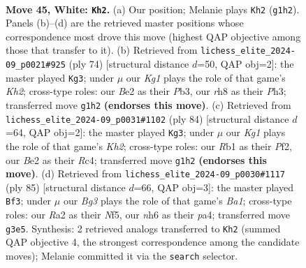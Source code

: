 \documentclass[11pt]{article}
\begin{document}
\clearpage

\begin{figure}[p]\centering
\begin{subfigure}{0.46\textwidth}\centering
\resizebox{\linewidth}{!}{%
\newchessgame
\chessboard[
  setfen={7r/p2rb1kp/7n/P7/8/1Pp3BP/R1P1B1P1/1R4K1 w - - 5 45},
  showmover=false,
  pgfstyle=straightmove, color=movearrow, markmove={g1-h2}
]}
\caption{}
\end{subfigure}\hfill
\begin{subfigure}{0.46\textwidth}\centering
\resizebox{\linewidth}{!}{%
\newchessgame
\chessboard[
  setfen={5rk1/6p1/3r3p/4R3/1p4P1/1P2Pp1P/P1R2P1K/8 w - - 3 38},
  showmover=false,
  pgfstyle=straightmove, color=movearrow, markmove={h2-g3}
]}
\caption{}
\end{subfigure}
\\[4pt]
\begin{subfigure}{0.46\textwidth}\centering
\resizebox{\linewidth}{!}{%
\newchessgame
\chessboard[
  setfen={8/3rk1p1/1p3p1p/3r4/1PR3P1/R6P/1P3P1K/8 w - - 1 43},
  showmover=false,
  pgfstyle=straightmove, color=movearrow, markmove={h2-g3}
]}
\caption{}
\end{subfigure}\hfill
\begin{subfigure}{0.46\textwidth}\centering
\resizebox{\linewidth}{!}{%
\newchessgame
\chessboard[
  setfen={b7/p1k5/1p2pr2/5n2/P5R1/2PN3p/3K3P/2R5 b - - 3 43},
  showmover=false,
  pgfstyle=straightmove, color=movearrow, markmove={a8-f3}
]}
\caption{}
\end{subfigure}
\caption{\textbf{Move 45, White: \texttt{Kh2}.} (a) Our position; Melanie plays \texttt{Kh2} (\texttt{g1h2}). Panels (b)--(d) are the retrieved master positions whose correspondence most drove this move (highest QAP objective among those that transfer to it). (b) Retrieved from \texttt{lichess\_elite\_2024-09\_p0021\#925} (ply 74) [structural distance $d$=50, QAP obj=2]: the master played \texttt{Kg3}; under $\mu$ our \emph{Kg1} plays the role of that game's \emph{Kh2}; cross-type roles: our \emph{B}e2 as their \emph{P}b3, our \emph{r}h8 as their \emph{P}h3; transferred move \texttt{g1h2} \textbf{(endorses this move)}. (c) Retrieved from \texttt{lichess\_elite\_2024-09\_p0031\#1102} (ply 84) [structural distance $d$=64, QAP obj=2]: the master played \texttt{Kg3}; under $\mu$ our \emph{Kg1} plays the role of that game's \emph{Kh2}; cross-type roles: our \emph{R}b1 as their \emph{P}f2, our \emph{B}e2 as their \emph{R}c4; transferred move \texttt{g1h2} \textbf{(endorses this move)}. (d) Retrieved from \texttt{lichess\_elite\_2024-09\_p0030\#1117} (ply 85) [structural distance $d$=66, QAP obj=3]: the master played \texttt{Bf3}; under $\mu$ our \emph{Bg3} plays the role of that game's \emph{Ba1}; cross-type roles: our \emph{R}a2 as their \emph{N}f5, our \emph{n}h6 as their \emph{p}a4; transferred move \texttt{g3e5}. Synthesis: 2 retrieved analogs transferred to \texttt{Kh2} (summed QAP objective 4, the strongest correspondence among the candidate moves); Melanie committed it via the \texttt{search} selector.}
\label{fig:thought-m88}
\end{figure}
\end{document}
